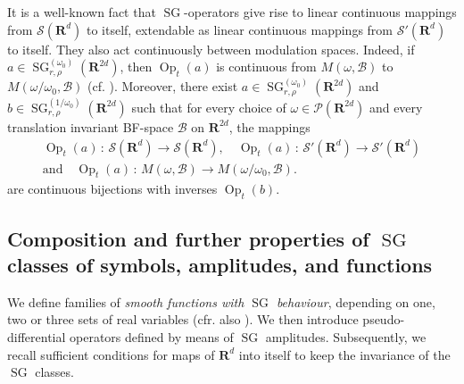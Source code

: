 \documentclass[12pt,a4paper,reqno]{amsart}
\numberwithin{equation}{section}
\numberwithin{thm}{section}
\theoremstyle{definition}
\theoremstyle{remark}
\begin{document}
It is a well-known fact that ${\operatorname{SG}}$-operators give rise to linear continuous mappings 
from $\mathscr S({\mathbf R^{d}})$ to itself, extendable as linear continuous mappings
from $\mathscr S'({\mathbf R^{d}})$ to itself. They also act continuously between modulation
spaces. Indeed,  if $a\in {\operatorname{SG}} ^{(\omega _0)}_{r,\rho} ({\mathbf R^{{2d}}})$, then ${\operatorname{Op}} _t(a)$
is continuous from $M(\omega ,\mathscr B)$ to $M(\omega /\omega
_0,\mathscr B)$ (cf. \cite{CJT2}). Moreover, 
there exist $a\in {\operatorname{SG}} ^{(\omega _0)}_{r,\rho} ({\mathbf R^{{2d}}})$ and $b\in {\operatorname{SG}}
^{(1/\omega _0)}_{r,\rho} ({\mathbf R^{{2d}}})$ such that for every choice of $\omega
\in \mathscr P({\mathbf R^{{2d}}})$ and every translation invariant BF-space $\mathscr
B$ on ${\mathbf R^{{2d}}}$, the mappings
\begin{gather*}
{\operatorname{Op}} _t(a)\, : \, \mathscr S({\mathbf R^{d}})\to \mathscr S({\mathbf R^{d}}),\quad {\operatorname{Op}} _t(a)\, : \,
\mathscr S'({\mathbf R^{d}})\to \mathscr S'({\mathbf R^{d}})
\\[1ex]
\text{and}\quad {\operatorname{Op}} _t(a)\, : \, M(\omega ,\mathscr B)\to M(\omega
/\omega _0,\mathscr B).
\end{gather*}
are continuous bijections with inverses ${\operatorname{Op}} _t(b)$.

\par

\subsection{Composition and further properties of ${\operatorname{SG}}$ classes of
symbols, amplitudes, and functions}\label{subs:1.4}
We define families of \emph{smooth functions with ${\operatorname{SG}}$ behaviour}, depending on
one, two or three sets of real variables (cfr. also \cite{CoSch}). We then introduce
pseudo-differential operators defined by means of ${\operatorname{SG}}$ amplitudes. Subsequently,
we recall sufficient conditions for maps of ${\mathbf R^{{d}}}$ into itself
to keep the invariance of the ${\operatorname{SG}}$ classes. 

\par
\end{document}
